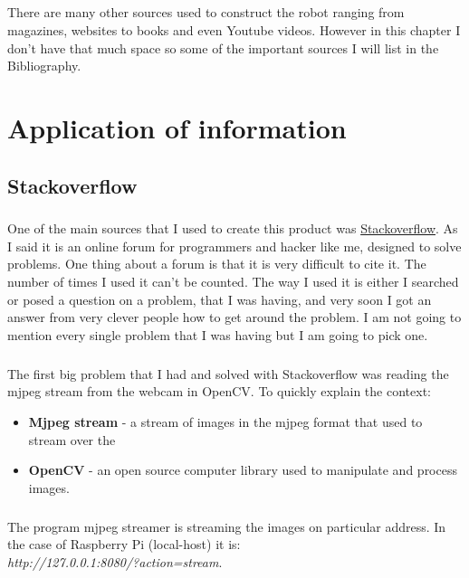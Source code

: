 \documentclass[12pt,a4paper]{report}
\begin{document}
\paragraph{}
There are many other sources used to construct the robot ranging from magazines, websites to books and even Youtube videos. However in this chapter I don’t have that much space so some of the important sources I will list in the Bibliography.


\chapter{Application of information}

\section{Stackoverflow}
\lstset{language=Python}
\paragraph{}
One of the main sources that I used to create this product was \href{http://stackoverflow.com}{Stackoverflow}. As I said it is an online forum for programmers and hacker like me, designed to solve problems. One thing about a forum is that it is very difficult to cite it. The number of times I used it can’t be counted. The way I used it is either I searched or posed a question on a problem, that I was having, and very soon I got an answer from very clever people how to get around the problem. I am not going to mention every single problem that I was having but I am going to pick one.

\paragraph{}
The first big problem that I had and solved with Stackoverflow was reading the mjpeg stream from the webcam in OpenCV. To quickly explain the context:

\begin{itemize}
    \item \textbf{Mjpeg stream} - a stream of images in the mjpeg format that used to stream over the
    \item \textbf{OpenCV} - an open source computer library used to manipulate and process images.
\end{itemize}

\paragraph{}
The program mjpeg streamer is streaming the images on particular address. In the case of Raspberry Pi (local-host) it is:
\\
\textit{http://127.0.0.1:8080/?action=stream}.
\end{document}
